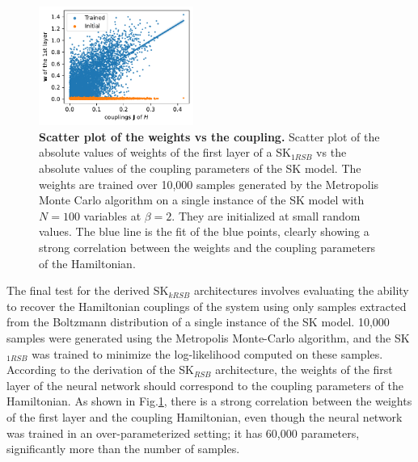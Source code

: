 \documentclass[aps,physrev,10pt,floatfix,reprint]{revtex4-2}
\begin{document}
\begin{figure}[h]
    \centering 
    \includegraphics[width=0.45\textwidth]{img/MC_img.pdf}
    \caption{\textbf{Scatter plot of the weights vs the coupling.} Scatter plot of the absolute values of weights of the first layer of a SK$_{1RSB}$ vs the absolute values of the coupling parameters of the SK model. The weights are trained over 10,000 samples generated by the Metropolis Monte Carlo algorithm on a single instance of the SK model with $N=100$ variables at $\beta=2$. They are initialized at small random values. The blue line is the fit of the blue points, clearly showing a strong correlation between the weights and the coupling parameters of the Hamiltonian.}
    \label{fig:SK_MC}
\end{figure}

The final test for the derived SK$_{kRSB}$ architectures involves evaluating the ability to recover the Hamiltonian couplings of the system using only samples extracted from the Boltzmann distribution of a single instance of the SK model. 10,000 samples were generated using the Metropolis Monte-Carlo algorithm, and the SK$_{1RSB}$ was trained to minimize the log-likelihood computed on these samples. According to the derivation of the SK$_{RSB}$ architecture, the weights of the first layer of the neural network should correspond to the coupling parameters of the Hamiltonian. As shown in Fig.\ref{fig:SK_MC}, there is a strong correlation between the weights of the first layer and the coupling Hamiltonian, even though the neural network was trained in an over-parameterized setting; it has 60,000 parameters, significantly more than the number of samples.
\end{document}
